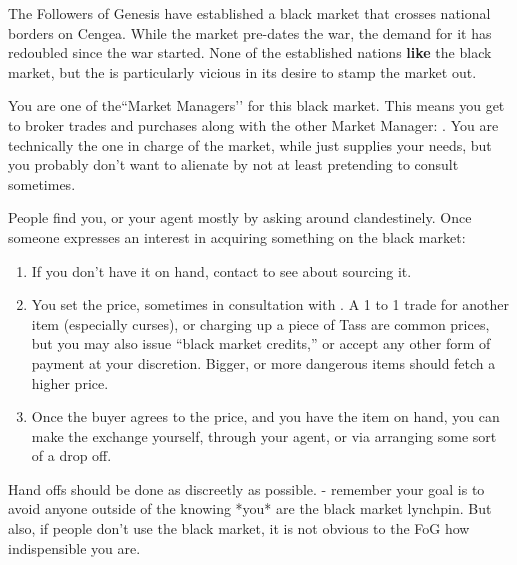 \documentclass[green]{GL2020}
\begin{document}
\name{\gBMRun{}}

The Followers of Genesis have established a black market that crosses national borders on Cengea. While the market pre-dates the war, the demand for it has redoubled since the war started. None of the established nations \textbf{like} the black market, but the \pTech{} is particularly vicious in its desire to stamp the market out.

You are one of the``Market Managers’’ for this black market. This means you get to broker trades and purchases along with the other Market Manager: \cChupInventor{\full}. You are technically the one in charge of the market, while \cChupInventor{} just supplies your needs, but you probably don’t want to alienate \cChupInventor{\them} by not at least pretending to consult \cChupInventor{\them} sometimes.

People find you, or your agent \cLibAssist{} mostly by asking around clandestinely. Once someone expresses an interest in acquiring something on the black market:

\begin{enumerate}
  \item If you don’t have it on hand, contact \cChupInventor{} to see about sourcing it.
  \item You set the price, sometimes in consultation with \cChupInventor{}. A 1 to 1 trade for another item (especially curses), or charging up a piece of Tass are common prices, but you may also issue “black market credits,” or accept any other form of payment at your discretion. Bigger, or more dangerous items should fetch a higher price.
  \item Once the buyer agrees to the price, and you have the item on hand, you can make the exchange yourself, through your agent, or via arranging some sort of a drop off.
\end{enumerate}

Hand offs should be done as discreetly as possible. - remember your goal is to avoid anyone outside of the \pGoaties{} knowing *you* are the black market lynchpin. But also, if people don’t use the black market, it is not obvious to the FoG how indispensible you are.
\end{document}
